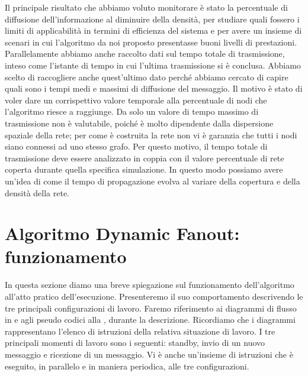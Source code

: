 Il principale risultato che abbiamo voluto monitorare è stato la percentuale di diffusione dell'informazione al diminuire della densità, per studiare quali fossero i limiti di applicabilità in termini di efficienza del sistema e per avere un insieme di scenari in cui l'algoritmo da noi proposto presentasse buoni livelli di prestazioni. Parallelamente abbiamo anche raccolto dati sul tempo totale di trasmissione, inteso come l'istante di tempo in cui l'ultima trasmissione si è conclusa. Abbiamo scelto di raccogliere anche quest'ultimo dato perché abbiamo cercato di capire quali sono i tempi medi e massimi di diffusione del messaggio. Il motivo è stato di voler dare un corrispettivo valore temporale alla percentuale di nodi che l'algoritmo riesce a raggiunge. Da solo un valore di tempo massimo di trasmissione non è valutabile, poiché è molto dipendente dalla dispersione spaziale della rete; per come è costruita la rete non vi è garanzia che tutti i nodi siano connessi ad uno stesso grafo. Per questo motivo, il tempo totale di trasmissione deve essere analizzato in coppia con il valore percentuale di rete coperta durante quella specifica simulazione. In questo modo possiamo avere un'idea di come il tempo di propagazione evolva al variare della copertura e della densità della rete.
\bigskip

\section{Algoritmo Dynamic Fanout: funzionamento}
In questa sezione diamo una breve spiegazione sul funzionamento dell'algoritmo all'atto pratico dell'esecuzione. Presenteremo il suo comportamento descrivendo le tre principali configurazioni di lavoro. Faremo riferimento ai diagrammi di flusso in  e agli pseudo codici alla , durante la descrizione. Ricordiamo che i diagrammi rappresentano l'elenco di istruzioni della relativa situazione di lavoro. I tre principali momenti di lavoro sono i seguenti: standby, invio di un nuovo messaggio e ricezione di un messaggio. Vi è anche un'insieme di istruzioni che è eseguito, in parallelo e in maniera periodica, alle tre configurazioni.
\bigskip

